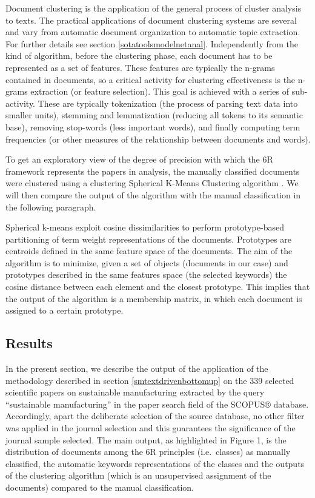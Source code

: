 \documentclass[]{book}
\begin{document}
Document clustering is the application of the general process of cluster
analysis to texts. The practical applications of document clustering
systems are several and vary from automatic document organization to
automatic topic extraction. For further details see section
\ref{sotatoolsmodelnetanal}. Independently from the kind of algorithm,
before the clustering phase, each document has to be represented as a
set of features. These features are typically the n-grams contained in
documents, so a critical activity for clustering effectiveness is the
n-grams extraction (or feature selection). This goal is achieved with a
series of sub-activity. These are typically tokenization (the process of
parsing text data into smaller units), stemming and lemmatization
(reducing all tokens to its semantic base), removing stop-words (less
important words), and finally computing term frequencies (or other
measures of the relationship between documents and words).

To get an exploratory view of the degree of precision with which the 6R
framework represents the papers in analysis, the manually classified
documents were clustered using a clustering Spherical K-Means Clustering
algorithm \citep{buchta2012spherical}. We will then compare the output
of the algorithm with the manual classification in the following
paragraph.

Spherical k-means exploit cosine dissimilarities to perform
prototype-based partitioning of term weight representations of the
documents. Prototypes are centroids defined in the same feature space of
the documents. The aim of the algorithm is to minimize, given a set of
objects (documents in our case) and prototypes described in the same
features space (the selected keywords) the cosine distance between each
element and the closest prototype. This implies that the output of the
algorithm is a membership matrix, in which each document is assigned to
a certain prototype.

\subsection{Results}\label{results-3}

In the present section, we describe the output of the application of the
methodology described in section \ref{smtextdrivenbottomup} on the 339
selected scientific papers on sustainable manufacturing extracted by the
query ``sustainable manufacturing'' in the paper search field of the
SCOPUS® database. Accordingly, apart the deliberate selection of the
source database, no other filter was applied in the journal selection
and this guarantees the significance of the journal sample selected. The
main output, as highlighted in Figure 1, is the distribution of
documents among the 6R principles (i.e.~classes) as manually classified,
the automatic keywords representations of the classes and the outputs of
the clustering algorithm (which is an unsupervised assignment of the
documents) compared to the manual classification.
\end{document}
